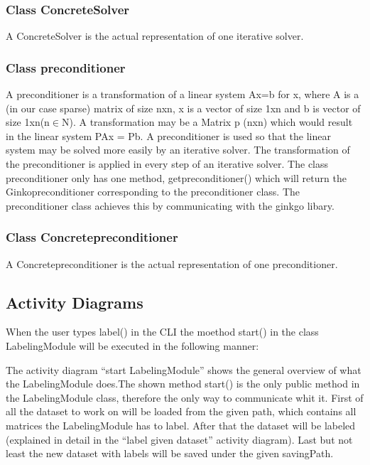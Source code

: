 \documentclass[parskip=full]{scrartcl}
\begin{document}
\subsubsection{Class ConcreteSolver}
A ConcreteSolver is the actual representation of one \gls{iterative solver}.

\subsubsection{Class \gls{preconditioner}}
A \gls{preconditioner} is a transformation of a linear system Ax=b for x, where A is a (in our case sparse) matrix of size nxn, x is a vector of size 1xn and b is vector of size 1xn(n$\in$N). A transformation may be a Matrix p (nxn) which would result in the linear system PAx = Pb. A \gls{preconditioner} is used so that the linear system may be solved more easily by an \gls{iterative solver}. The transformation of the \gls{preconditioner} is applied in every step of an \gls{iterative solver}. \newline\newline
The class \gls{preconditioner} only has one method, get\gls{preconditioner}() which will return the Ginko\gls{preconditioner} corresponding to the \gls{preconditioner} class. The \gls{preconditioner} class achieves this by communicating with the ginkgo libary.

\subsubsection{Class Concrete\gls{preconditioner}}
A Concrete\gls{preconditioner} is the actual representation of one \gls{preconditioner}.

\subsection{Activity Diagrams}
When the user types label() in the CLI the moethod start() in the class LabelingModule will be executed in the following manner:

The activity diagram ``start LabelingModule'' shows the general overview of what the LabelingModule does.The shown method start() is the only public method in the LabelingModule class, therefore the only way to communicate whit it.
First of all the dataset to work on will be loaded from the given path, which contains all matrices the LabelingModule has to label.
After that the dataset will be labeled (explained in detail in the ``label given dataset'' activity diagram).
Last but not least the new dataset with \glspl{label} will be saved under the given savingPath.
\end{document}
